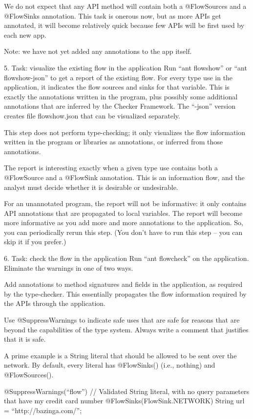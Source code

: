 We do not expect that any API method will contain both a @FlowSources
and a @FlowSinks annotation.
This task is onerous now, but as more APIs get annotated, it will
become relatively quick because few APIs will be first used by each
new app.

Note: we have not yet added any annotations to the app itself.


5. Task: visualize the existing flow in the application
Run “ant flowshow” or “ant flowshow-json” to get a report of the
existing flow.
For every type use in the application, it indicates the flow sources
and sinks for that variable. This is exactly the annotations written
in the program, plus possibly some additional annotations that are
inferred by the Checker Framework.
The “-json” version creates file flowshow.json that can be visualized
separately.

This step does not perform type-checking; it only visualizes the flow
information written in the program or libraries as annotations, or
inferred from those annotations.

The report is interesting exactly when a given type use contains both
a @FlowSource and a @FlowSink annotation. This is an information flow,
and the analyst must decide whether it is desirable or undesirable.

For an unannotated program, the report will not be informative: it
only contains API annotations that are propagated to local
variables. The report will become more informative as you add more and
more annotations to the application. So, you can periodically rerun
this step. (You don’t have to run this step -- you can skip it if you
prefer.)


6. Task: check the flow in the application
Run “ant flowcheck” on the application.
Eliminate the warnings in one of two ways.

Add annotations to method signatures and fields in the application, as
required by the type-checker. This essentially propagates the flow
information required by the APIs through the application.

Use @SuppressWarnings to indicate safe uses that are safe for reasons
that are beyond the capabilities of the type system. Always write a
comment that justifies that it is safe.

A prime example is a String literal that should be allowed to be sent
over the network. By default, every literal has @FlowSinks()
(i.e., nothing) and @FlowSources().

    @SuppressWarnings(“flow”) // Validated String literal, with no query parameters that have my credit card number
    @FlowSinks(FlowSink.NETWORK) String url = “http://bazinga.com/”;

